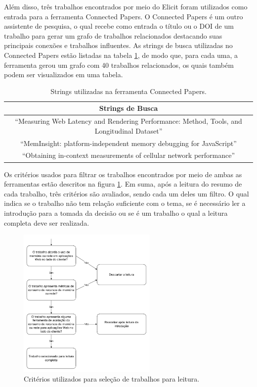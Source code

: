 \documentclass[12pt]{tcc}
\begin{document}
	Além disso, três trabalhos encontrados por meio do Elicit foram utilizados como entrada para a ferramenta Connected Papers.
	O Connected Papers é um outro assistente de pesquisa, o qual recebe como entrada o título ou o DOI de um trabalho para gerar um grafo de trabalhos relacionados destacando suas principais conexões e trabalhos influentes.
	As strings de busca utilizadas no Connected Papers estão listadas na tabela \ref{tab:strings-connected-papers}, de modo que, para cada uma, a ferramenta gerou um grafo com 40 trabalhos relacionados, os quais também podem ser visualizados em uma tabela. \\

	\begin{table}[h!]
	\centering

	\caption{Strings utilizadas na ferramenta Connected Papers.}
	\begin{tabular}{||c||} 

	\hline
		Strings de Busca \\
	\hline\hline
	``Measuring Web Latency and Rendering Performance: Method, Tools, and Longitudinal Dataset''\\
	``MemInsight: platform-independent memory debugging for JavaScript''\\
	``Obtaining in-context measurements of cellular network performance''\\
	\hline
	\end{tabular}
	\label{tab:strings-connected-papers}
	\end{table}

	Os critérios usados para filtrar os trabalhos encontrados por meio de ambas as ferramentas estão descritos na figura \ref{fig:fluxo-leitura}.
	Em suma, após a leitura do resumo de cada trabalho, três critérios são avaliados, sendo cada um deles um filtro.
	O qual indica se o trabalho não tem relação suficiente com o tema, se é necessário ler a introdução para a tomada da decisão ou se é um trabalho o qual a leitura completa deve ser realizada.

	\begin{figure}[!ht]
		\centering
		\includegraphics[width=0.6\textwidth]{figures/fluxo-decisao-leitura.pdf}
		\caption{Critérios utilizados para seleção de trabalhos para leitura.}
		\label{fig:fluxo-leitura}
	\end{figure}
\end{document}
